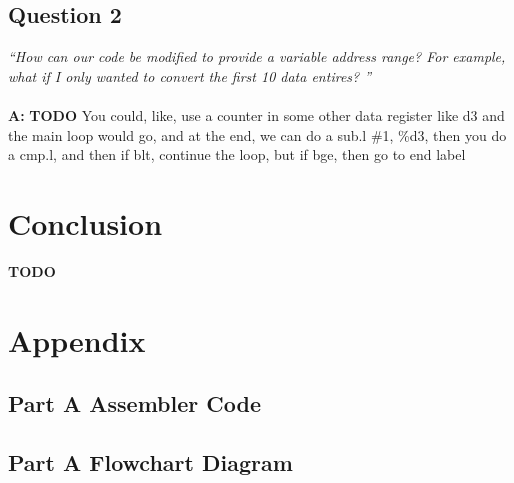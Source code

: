 \documentclass[letterpaper]{article}
\begin{document}
    \subsection{Question 2}
      \textit{``How can our code be modified to provide a variable address range? For example, what if I only wanted to convert the first 10 data entires? ''}
      \\ \\
      \noindent\textbf{A:}
      \textbf{TODO}
      You could, like, use a counter in some other data register like d3
      and the main loop would go, and at the end, we can do a sub.l \#1, \%d3,
      then you do a cmp.l, and then if blt,
      continue the loop, but if bge, then go to end label

\section{Conclusion}
\textbf{TODO}
  \lipsum[9]
  \lipsum[10]

\newpage
\section{Appendix}
  \subsection{Part A Assembler Code}
    
\newpage
  \subsection{Part A Flowchart Diagram}
    \vspace{2cm}
    \noindent{}
\newpage
\end{document}
